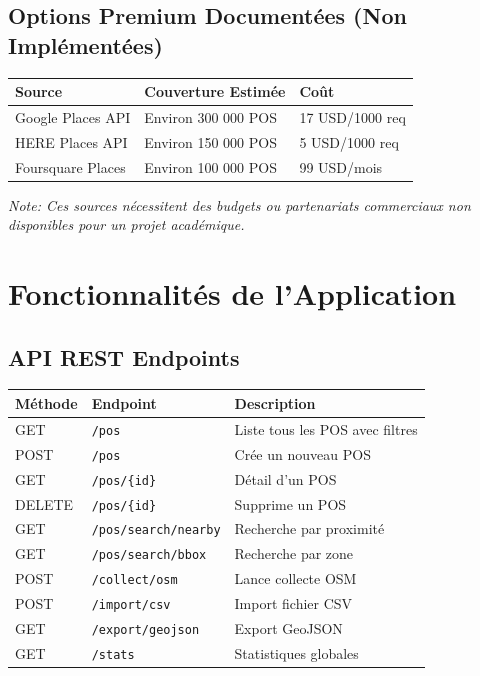 \documentclass[11pt,a4paper]{article}
\begin{document}
\subsection{Options Premium Documentées (Non Implémentées)}

\begin{warningbox}
\begin{center}
\begin{tabular}{lll}
\toprule
\textbf{Source} & \textbf{Couverture Estimée} & \textbf{Coût} \\
\midrule
Google Places API & Environ 300 000 POS & 17 USD/1000 req \\
HERE Places API & Environ 150 000 POS & 5 USD/1000 req \\
Foursquare Places & Environ 100 000 POS & 99 USD/mois \\
\bottomrule
\end{tabular}
\end{center}
\textit{Note: Ces sources nécessitent des budgets ou partenariats commerciaux non disponibles pour un projet académique.}
\end{warningbox}


\section{Fonctionnalités de l'Application}

\subsection{API REST Endpoints}

\begin{center}
\begin{tabular}{llp{6cm}}
\toprule
\textbf{Méthode} & \textbf{Endpoint} & \textbf{Description} \\
\midrule
GET & \texttt{/pos} & Liste tous les POS avec filtres \\
POST & \texttt{/pos} & Crée un nouveau POS \\
GET & \texttt{/pos/\{id\}} & Détail d'un POS \\
DELETE & \texttt{/pos/\{id\}} & Supprime un POS \\
GET & \texttt{/pos/search/nearby} & Recherche par proximité \\
GET & \texttt{/pos/search/bbox} & Recherche par zone \\
POST & \texttt{/collect/osm} & Lance collecte OSM \\
POST & \texttt{/import/csv} & Import fichier CSV \\
GET & \texttt{/export/geojson} & Export GeoJSON \\
GET & \texttt{/stats} & Statistiques globales \\
\bottomrule
\end{tabular}
\end{center}
\end{document}
